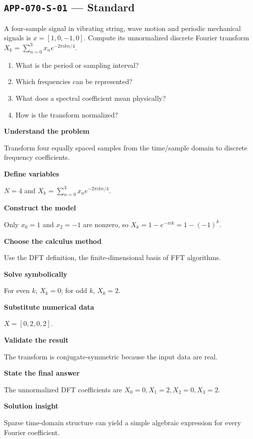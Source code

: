\documentclass[11pt]{book}
\newcommand{\pid}[1]{\texttt{#1}}
\begin{document}
\subsection*{\pid{APP-070-S-01} — Standard}
\begin{problembox}
A four-sample signal in vibrating string, wave motion and periodic mechanical signals is $x=[1,0,-1,0]$. Compute its unnormalized discrete Fourier transform $X_k=\sum_{n=0}^3 x_ne^{-2\pi i kn/4}$.
\end{problembox}
\begin{promptbox}\begin{enumerate}
\item What is the period or sampling interval?
\item Which frequencies can be represented?
\item What does a spectral coefficient mean physically?
\item How is the transform normalized?
\end{enumerate}\end{promptbox}
\begin{solutionbox}
\textbf{Understand the problem}\par Transform four equally spaced samples from the time/sample domain to discrete frequency coefficients.\par\medskip
\textbf{Define variables}\par $N=4$ and $X_k=\sum_{n=0}^{3}x_n e^{-2\pi i kn/4}$.\par\medskip
\textbf{Construct the model}\par Only $x_0=1$ and $x_2=-1$ are nonzero, so $X_k=1-e^{-\pi i k}=1-(-1)^k$.\par\medskip
\textbf{Choose the calculus method}\par Use the DFT definition, the finite-dimensional basis of FFT algorithms.\par\medskip
\textbf{Solve symbolically}\par For even $k$, $X_k=0$; for odd $k$, $X_k=2$.\par\medskip
\textbf{Substitute numerical data}\par $X=[0,2,0,2]$.\par\medskip
\textbf{Validate the result}\par The transform is conjugate-symmetric because the input data are real.\par\medskip
\textbf{State the final answer}\par The unnormalized DFT coefficients are $X_0=0,X_1=2,X_2=0,X_3=2$.\par\medskip
\textbf{Solution insight}\par Sparse time-domain structure can yield a simple algebraic expression for every Fourier coefficient.\par\medskip
\end{solutionbox}
\end{document}
